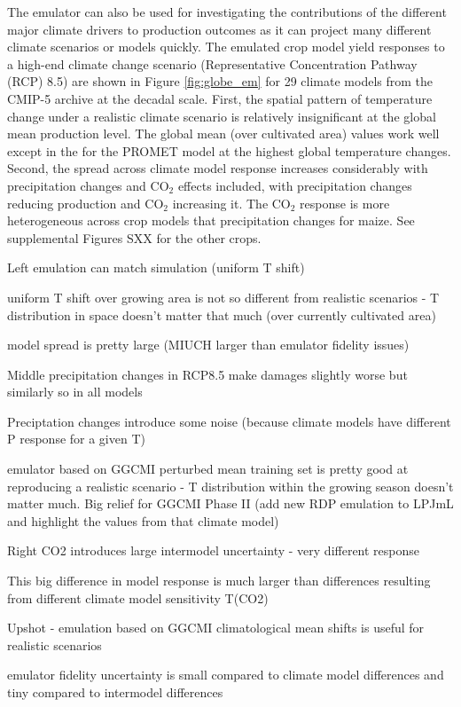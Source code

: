 \documentclass[gmd, manuscript]{copernicus} %
\begin{document}
The emulator can also be used for investigating the contributions of the different major climate drivers to production outcomes as it can project many different climate scenarios or models quickly.
The emulated crop model yield responses to a high-end climate change scenario (Representative Concentration Pathway (RCP) 8.5) are shown in Figure \ref{fig:globe_em} for 29 climate models from the CMIP-5 archive \citep{Taylor2012} at the decadal scale.
First, the spatial pattern of temperature change under a realistic climate scenario is relatively insignificant at the global mean production level.
The global mean (over cultivated area) values work well except in the for the PROMET model at the highest global temperature changes. 
Second, the spread across climate model response increases considerably with precipitation changes and CO$_2$ effects included, with precipitation changes reducing production and CO$_2$ increasing it.
The CO$_2$ response is more heterogeneous across crop models that precipitation changes for maize. 
See supplemental Figures SXX for the other crops.

Left
emulation can match simulation (uniform T shift)

uniform T shift over growing area is not so different from realistic scenarios - T distribution in space doesn't matter that much (over currently cultivated area)

model spread is pretty large (MIUCH larger than emulator fidelity issues)

Middle
precipitation changes in RCP8.5 make damages slightly worse but similarly so in all models

Preciptation changes introduce some noise (because climate models have different P response for a given T)

emulator based on GGCMI perturbed mean training set is pretty good at reproducing a realistic scenario - T distribution within the growing season doesn't matter much. Big relief for GGCMI Phase II (add new RDP emulation to LPJmL and highlight the values from that climate model)

Right
CO2 introduces large intermodel uncertainty - very different response

This big difference in model response  is much larger than differences resulting from different climate model sensitivity T(CO2)

Upshot -
emulation based on GGCMI climatological mean shifts is useful for realistic scenarios

emulator fidelity uncertainty is small compared to climate model differences and tiny compared to intermodel differences
\end{document}
